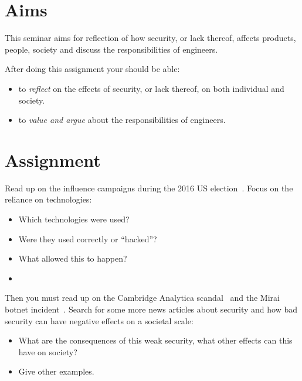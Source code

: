 \section{Aims}

This seminar aims for reflection of how security, or lack thereof, affects 
products, people, society and discuss the responsibilities of engineers.
\begin{frame}
After doing this assignment your should be able:
\begin{itemize}
  \item to \emph{reflect} on the effects of security, or lack thereof, on both 
    individual and society.
  \item to \emph{value and argue} about the responsibilities of engineers.
\end{itemize}
\end{frame}


\section{Assignment}%
\label{sec:Tasks}

Read up on the influence campaigns during the 2016 US 
election~\cite{inside-russian-influence-campaign}.
Focus on the reliance on technologies:
\begin{frame}
\begin{itemize}
  \item Which technologies were used?
  \item Were they used correctly or \enquote{hacked}?
  \item What allowed this to happen?
  \item \Etc
\end{itemize}
\end{frame}

Then you must read up on the Cambridge Analytica scandal~\cite[\eg][]{%
  wired-cambridge-analytica,
  guardian-cambridge-analytica,
  nytimes-cambridge-analytica,
  wp-cambridge-analytica,
} and the Mirai botnet incident~\cite{schneier-mirai}.
Search for some more news articles about security and how bad security can have 
negative effects on a societal scale:
\begin{frame}
\begin{itemize}
  \item What are the consequences of this weak security, what other effects can 
    this have on society?
  \item Give other examples.
\end{itemize}
\end{frame}

